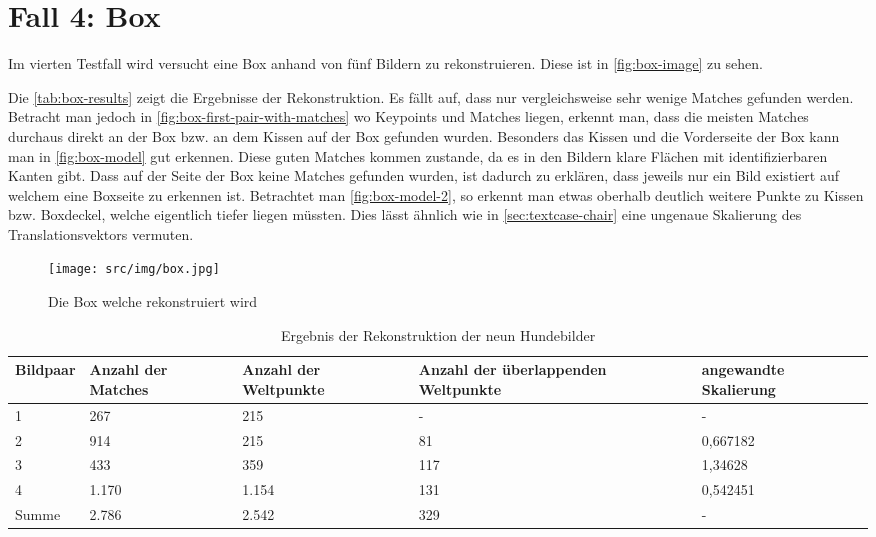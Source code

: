 \section{Fall 4: Box}
\label{sec:testcase-box}
Im vierten Testfall wird versucht eine Box anhand von fünf Bildern zu rekonstruieren.
Diese ist in \autoref{fig:box-image} zu sehen.

Die \autoref{tab:box-results} zeigt die Ergebnisse der Rekonstruktion.
Es fällt auf, dass nur vergleichsweise sehr wenige Matches gefunden werden.
Betracht man jedoch in \autoref{fig:box-first-pair-with-matches} wo Keypoints und Matches liegen, erkennt man, dass die meisten Matches durchaus direkt an der Box bzw. an dem Kissen auf der Box gefunden wurden.
Besonders das Kissen und die Vorderseite der Box kann man in \autoref{fig:box-model} gut erkennen.
Diese guten Matches kommen zustande, da es in den Bildern klare Flächen mit identifizierbaren Kanten gibt.
Dass auf der Seite der Box keine Matches gefunden wurden, ist dadurch zu erklären, dass jeweils nur ein Bild existiert auf welchem eine Boxseite zu erkennen ist.
Betrachtet man \autoref{fig:box-model-2}, so erkennt man etwas oberhalb deutlich weitere Punkte zu Kissen bzw. Boxdeckel, welche eigentlich tiefer liegen müssten.
Dies lässt ähnlich wie in \autoref{sec:textcase-chair} eine ungenaue Skalierung des Translationsvektors vermuten.

\begin{figure}
    \texttt{[image: src/img/box.jpg]}
    \caption{Die Box welche rekonstruiert wird}
    \label{fig:box-image}
\end{figure}

\begin{table}
    \begin{tabularx}{\textwidth}{XXXXX}
        \toprule
        Bildpaar &  Anzahl der Matches & Anzahl der Weltpunkte & Anzahl der überlappenden Weltpunkte & angewandte Skalierung \\ 
        \midrule
        1 & 267 & 215 & -  & - \\
        2 & 914 & 215 & 81 & 0,667182 \\
        3 & 433 & 359 & 117 & 1,34628 \\
        4 & 1.170 & 1.154 & 131 & 0,542451 \\
        \midrule
        Summe & 2.786 & 2.542 & 329 & - \\
        \bottomrule
    \end{tabularx}
    \caption{Ergebnis der Rekonstruktion der neun Hundebilder}
    \label{tab:box-results}
\end{table}

